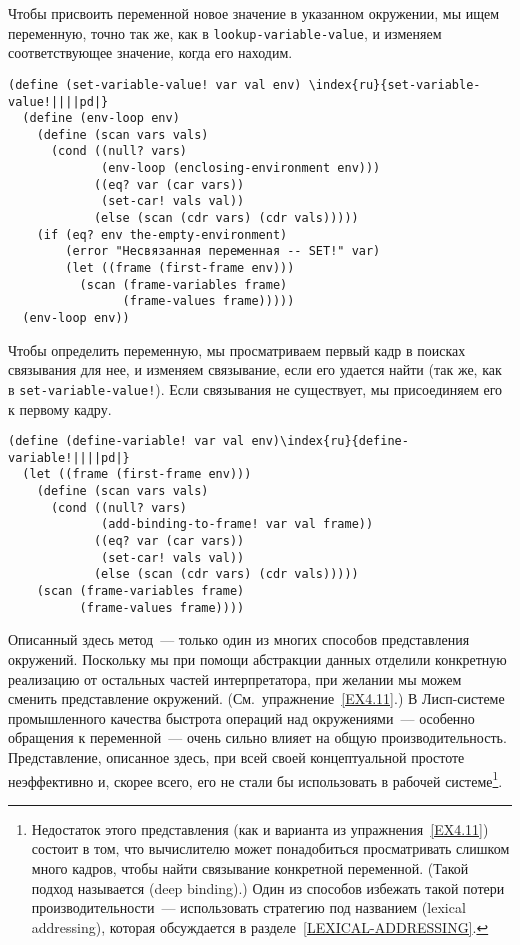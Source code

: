 Чтобы присвоить переменной новое значение в указанном
окружении, мы ищем переменную, точно так же, как в
{\tt lookup-variable-value}, и изменяем соответствующее
значение, когда его находим.

\begin{Verbatim}[fontsize=\small]
(define (set-variable-value! var val env) \index{ru}{set-variable-value!||||pd|}
  (define (env-loop env)
    (define (scan vars vals)
      (cond ((null? vars)
             (env-loop (enclosing-environment env)))
            ((eq? var (car vars))
             (set-car! vals val))
            (else (scan (cdr vars) (cdr vals)))))
    (if (eq? env the-empty-environment)
        (error "Несвязанная переменная -- SET!" var)
        (let ((frame (first-frame env)))
          (scan (frame-variables frame)
                (frame-values frame)))))
  (env-loop env))
\end{Verbatim}

Чтобы определить переменную, мы просматриваем первый
кадр в поисках связывания для нее, и изменяем связывание, если его
удается найти (так же, как в {\tt set-variable-value!}).  Если
связывания не существует, мы присоединяем его к первому кадру.

\begin{Verbatim}[fontsize=\small]
(define (define-variable! var val env)\index{ru}{define-variable!||||pd|}
  (let ((frame (first-frame env)))
    (define (scan vars vals)
      (cond ((null? vars)
             (add-binding-to-frame! var val frame))
            ((eq? var (car vars))
             (set-car! vals val))
            (else (scan (cdr vars) (cdr vals)))))
    (scan (frame-variables frame)
          (frame-values frame))))
\end{Verbatim}

Описанный здесь метод~--- только один из многих способов
представления окружений.  Поскольку мы при помощи 
абстракции данных 
отделили конкретную  реализацию от остальных частей интерпретатора,
при желании мы можем сменить представление окружений.
(См.~упражнение~\ref{EX4.11}.) В Лисп-системе промышленного
качества быстрота операций над окружениями~--- особенно обращения к
переменной~--- очень сильно влияет на общую производительность.
Представление, описанное здесь, при всей своей концептуальной простоте
неэффективно и, скорее всего, его не стали бы использовать в
рабочей системе\footnote{Недостаток этого представления (как и варианта
из упражнения~\ref{EX4.11}) состоит в том, что вычислителю
может понадобиться просматривать слишком много кадров, чтобы найти
связывание конкретной переменной. (Такой подход называется
 (deep binding).)
Один из способов избежать такой потери производительности~---
использовать стратегию под названием 
 (lexical addressing),
которая обсуждается в 
разделе~\ref{LEXICAL-ADDRESSING}.}.

